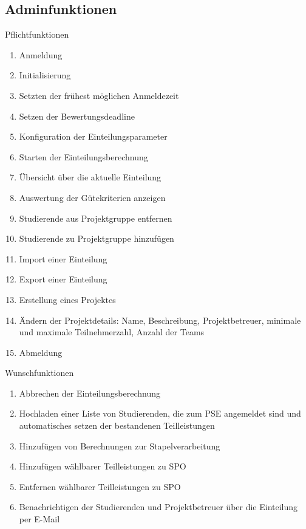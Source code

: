 \documentclass[parskip=full]{scrartcl}
\newcommand{\swtLabel}[1]{\textbf{\textbackslash #1\arabic*0\textbackslash}}
\begin{document}
\subsection{Adminfunktionen}

Pflichtfunktionen

\begin{enumerate}[label=\swtLabel{FA}, resume]
  \item Anmeldung
  \item Initialisierung
  \item Setzten der frühest möglichen Anmeldezeit
  \item Setzen der Bewertungsdeadline
  \item Konfiguration der Einteilungsparameter
  \item Starten der Einteilungsberechnung
  \item Übersicht über die aktuelle Einteilung
  \item Auswertung der Gütekriterien anzeigen
  \item Studierende aus Projektgruppe entfernen
  \item Studierende zu Projektgruppe hinzufügen
  \item Import einer Einteilung
  \item Export einer Einteilung
  \item Erstellung eines Projektes
  \item Ändern der Projektdetails: Name, Beschreibung, Projektbetreuer, 
        minimale und maximale Teilnehmerzahl, Anzahl der Teams
  \item Abmeldung
\end{enumerate}

Wunschfunktionen

\begin{enumerate}[label=\swtLabel{FA}, resume]
  \item Abbrechen der Einteilungsberechnung
  \item Hochladen einer Liste von Studierenden, die zum PSE angemeldet sind
	    und automatisches setzen der bestandenen Teilleistungen
  \item Hinzufügen von Berechnungen zur Stapelverarbeitung
  \item Hinzufügen wählbarer Teilleistungen zu SPO
  \item Entfernen wählbarer Teilleistungen zu SPO
  \item Benachrichtigen der Studierenden und Projektbetreuer über die Einteilung per E-Mail
\end{enumerate}
\end{document}
